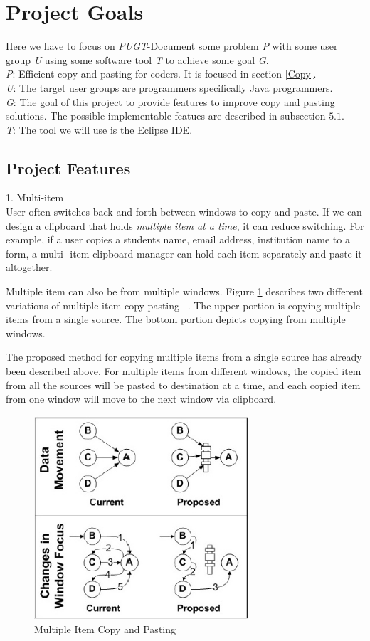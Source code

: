 \documentclass{acm_proc_article-sp}
\begin{document}
\section{Project Goals}
Here we have to focus on \textit{PUGT}-Document some problem \textit{P} with some user group \textit{U} using some software tool \textit{T} to achieve some goal \textit{G}.\\
\textit{P}: Efficient copy and pasting for coders. It is focused in section \ref{Copy}.\\
\textit{U}: The target user groups are programmers specifically Java programmers.\\
\textit{G}: The goal of this project to provide features to improve copy and pasting solutions. The possible implementable featues are described in subsection $5.1$.\\
\textit{T}: The tool we will use is the Eclipse IDE.

\subsection{Project Features} 
1. Multi-item\\
 User often switches back and forth between windows to copy and paste. If we can design a clipboard that holds \textit{ multiple item at a time}, it can reduce switching. For example, if a user copies a students name, email address, institution name to a form, a multi- item clipboard manager can hold each item separately and paste it altogether.
 
 Multiple item can also be from multiple windows. Figure \ref{fig:Multi} describes two different variations of multiple item copy pasting ~\cite{cpHabits}. The upper portion is copying multiple items from a single source. The bottom portion depicts copying from multiple windows.
 
 The proposed method for copying multiple items from a single source has already been described above. For multiple items from different windows, the copied item from all the sources will be pasted to destination at a time, and each copied item from one window  will move to the next window via clipboard.
 
 \begin{figure}[h]
 \centering
\includegraphics[width=8cm]{MultiItem}
\caption{Multiple Item Copy and Pasting}
    \label{fig:Multi}
\end{figure} 
\end{document}
